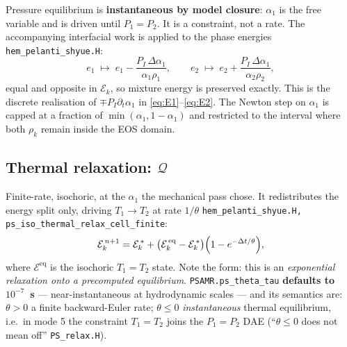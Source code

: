 \documentclass[11pt,a4paper]{article}
\newcommand{\code}[1]{\texttt{\small #1}}
\newcommand{\src}[1]{{\color{gray}\code{#1}}}
\begin{document}
Pressure equilibrium is \textbf{instantaneous by model closure}: $\alpha_1$ is
the free variable and is driven until $P_1=P_2$.  It is a constraint, not a
rate.  The accompanying interfacial work is applied to the phase energies
\src{hem\_pelanti\_shyue.H}:
\begin{equation}
  e_1 \;\mapsto\; e_1 - \frac{P_{\!I}\,\Delta\alpha_1}{\alpha_1\rho_1},
  \qquad
  e_2 \;\mapsto\; e_2 + \frac{P_{\!I}\,\Delta\alpha_1}{\alpha_2\rho_2},
  \label{eq:mechwork}
\end{equation}
equal and opposite in $\mathcal{E}_k$, so mixture energy is preserved
exactly.  This is the discrete realisation of $\mp P_{\!I}\partial_t\alpha_1$
in \eqref{eq:E1}--\eqref{eq:E2}.  The Newton step on $\alpha_1$ is capped at a
fraction of $\min(\alpha_1,1-\alpha_1)$ and restricted to the interval where
both $\rho_k$ remain inside the EOS domain.

\subsection{Thermal relaxation: $\mathcal{Q}$}

Finite-rate, isochoric, at the $\alpha_1$ the mechanical pass chose.  It
redistributes the energy split only, driving $T_1\!\to\!T_2$ at rate
$1/\theta$ \src{hem\_pelanti\_shyue.H, ps\_iso\_thermal\_relax\_cell\_finite}:
\begin{equation}
  \mathcal{E}_k^{\,n+1}
    = \mathcal{E}_k^{\,*}
    + \bigl(\mathcal{E}_k^{\,\mathrm{eq}}-\mathcal{E}_k^{\,*}\bigr)
      \Bigl(1-e^{-\Delta t/\theta}\Bigr),
  \label{eq:thermal}
\end{equation}
where $\mathcal{E}^{\mathrm{eq}}$ is the isochoric $T_1\!=\!T_2$ state.  Note
the form: this is an \emph{exponential relaxation onto a precomputed
equilibrium}.  \code{PSAMR.ps\_theta\_tau} \textbf{defaults to
$10^{-7}$~s} --- near-instantaneous at
hydrodynamic scales --- and its semantics are: $\theta>0$ a finite
backward-Euler rate; $\theta\le0$ \emph{instantaneous} thermal
equilibrium, i.e.\ in mode 5 the constraint $T_1\!=\!T_2$ joins the
$P_1\!=\!P_2$ DAE (``$\theta\le0$ does not mean off''
\src{PS\_relax.H}).
\end{document}
